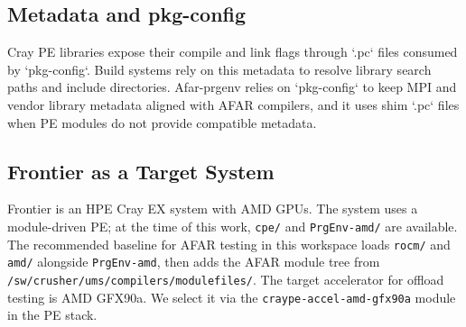 \subsection{Metadata and pkg-config}
\label{sec:pkgconfig-bg}
Cray PE libraries expose their compile and link flags through `.pc` files
consumed by `pkg-config`. Build systems rely on this metadata to resolve
library search paths and include directories. Afar-prgenv relies on
`pkg-config` to keep MPI and vendor library metadata aligned with AFAR
compilers, and it uses shim `.pc` files when PE modules do not provide
compatible metadata.

\subsection{Frontier as a Target System}
\label{sec:frontier}
Frontier is an HPE Cray EX system with AMD GPUs. The system uses a
module-driven PE; at the time of this work, \texttt{cpe/\allowbreak \peversion}
and \texttt{PrgEnv-amd/\allowbreak \prgenvversion} are available. The
recommended baseline for AFAR testing in this workspace loads
\texttt{rocm/\allowbreak \afarrocm} and \texttt{amd/\allowbreak \afarrocm}
alongside \texttt{PrgEnv-amd}, then adds the AFAR module tree from
\texttt{/sw/crusher/ums/compilers/\allowbreak modulefiles/}.
The target accelerator for offload testing is AMD GFX90a. We select it via the
\texttt{craype-accel-}\allowbreak\texttt{amd-gfx90a} module in the PE stack.
